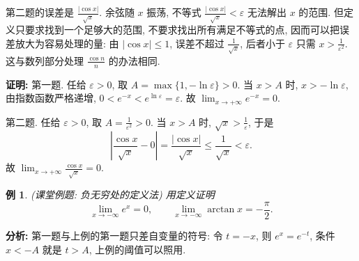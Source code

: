 \documentclass[UTF8,openany]{ctexbook}
\theoremstyle{chinesetextbook}
\newtheorem{example}{例}[section]
\newenvironment{cnproof}{\par\indent\textbf{证明:} \ignorespaces}{\par}
\begin{document}
第二题的误差是 $\displaystyle\frac{|\cos x|}{\sqrt x}$. 余弦随 $x$ 振荡, 不等式 $\displaystyle\frac{|\cos x|}{\sqrt x}<\varepsilon$ 无法解出 $x$ 的范围. 但定义只要求找到一个足够大的范围, 不要求找出所有满足不等式的点, 因而可以把误差放大为容易处理的量: 由 $|\cos x|\le1$, 误差不超过 $\displaystyle\frac1{\sqrt x}$, 后者小于 $\varepsilon$ 只需 $\displaystyle x>\frac1{\varepsilon^2}$. 这与数列部分处理 $\displaystyle\frac{\cos n}n$ 的办法相同.
\begin{cnproof}
第一题. 任给 $\varepsilon>0$, 取 $A=\max\{1,-\ln\varepsilon\}>0$. 当 $x>A$ 时, $x>-\ln\varepsilon$, 由指数函数严格递增, $0<e^{-x}<e^{\ln\varepsilon}=\varepsilon$. 故 $\displaystyle\lim_{x\to+\infty}e^{-x}=0$.

第二题. 任给 $\varepsilon>0$, 取 $\displaystyle A=\frac1{\varepsilon^2}>0$. 当 $x>A$ 时, $\displaystyle\sqrt x>\frac1\varepsilon$, 于是
\[
\left|\frac{\cos x}{\sqrt x}-0\right|=\frac{|\cos x|}{\sqrt x}\le\frac1{\sqrt x}<\varepsilon.
\]
故 $\displaystyle\lim_{x\to+\infty}\frac{\cos x}{\sqrt x}=0$.
\end{cnproof}
\begin{example}
\textnormal{(课堂例题: 负无穷处的定义法)} 用定义证明
\[
\lim_{x\to-\infty}e^x=0,\qquad
\lim_{x\to-\infty}\arctan x=-\frac\pi2.
\]
\end{example}
\par\indent\textbf{分析:} 第一题与上例的第一题只差自变量的符号: 令 $t=-x$, 则 $e^x=e^{-t}$, 条件 $x<-A$ 就是 $t>A$, 上例的阈值可以照用.
\end{document}
